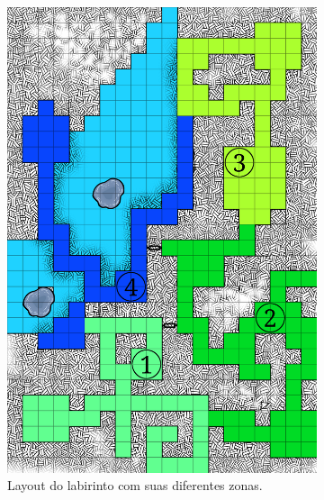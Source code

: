 \documentclass[
	12pt,				%
	openright,			%
	twoside,			%
	a4paper,			%
	english,			%
	french,				%
	spanish,			%
	brazil				%
	]{abntex2}
\begin{document}
\begin{figure}[h!]
  \centering
  \begin{subfigure}[b]{0.45\linewidth}
    \includegraphics[width=\linewidth]{encounterZones.png}
     \caption{Layout do labirinto com suas diferentes zonas.}
  \end{subfigure}
  \begin{subfigure}[b]{0.45\linewidth}

\end{subfigure}
\end{figure}
\end{document}
